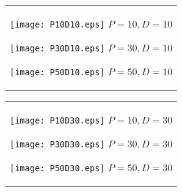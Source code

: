 \documentclass[a4paper,11pt,oneside,openany]{jsbook}
\begin{document}
\begin{figure}[htbp]
  \begin{center}
    \begin{tabular}{c}


      \begin{minipage}{0.33\hsize}
        \begin{center}
          \texttt{[image: P10D10.eps]}
          \hspace{1.2cm}$P=10, D=10
$        \end{center}
      \end{minipage}

      \begin{minipage}{0.33\hsize}
        \begin{center}
          \texttt{[image: P30D10.eps]}
          \hspace{1.2cm}$P=30, D=10
$        \end{center}
      \end{minipage}

      \begin{minipage}{0.33\hsize}
        \begin{center}
          \texttt{[image: P50D10.eps]}
          \hspace{1.2cm}$P=50, D=10
$        \end{center}
      \end{minipage}
    \end{tabular}
  \end{center}
\end{figure}
\begin{figure}[htbp]
  \begin{center}
    \begin{tabular}{c}


      \begin{minipage}{0.33\hsize}
        \begin{center}
          \texttt{[image: P10D30.eps]}
          \hspace{1.2cm}$P=10, D=30
$        \end{center}
      \end{minipage}

      \begin{minipage}{0.33\hsize}
        \begin{center}
          \texttt{[image: P30D30.eps]}
          \hspace{1.2cm}$P=30, D=30
$        \end{center}
      \end{minipage}

      \begin{minipage}{0.33\hsize}
        \begin{center}
          \texttt{[image: P50D30.eps]}
          \hspace{1.2cm}$P=50, D=30
$        \end{center}
      \end{minipage}
    \end{tabular}
  \end{center}
\end{figure}
\end{document}

